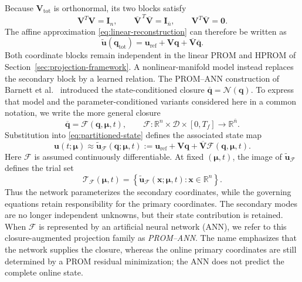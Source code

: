 \documentclass[11pt]{article}
\newcommand{\q}{\mathbf q}
\newcommand{\qbar}{\overline{\mathbf q}}
\newcommand{\qtot}{\mathbf q_{\mathrm{tot}}}
\newcommand{\uvec}{\mathbf u}
\newcommand{\utilde}{\widetilde{\mathbf u}}
\newcommand{\mub}{\bm\mu}
\begin{document}
Because $\mathbf V_{\mathrm{tot}}$ is orthonormal, its two blocks satisfy
\begin{equation}
\mathbf V^T\mathbf V=\mathbf I_n,\qquad
\overline{\mathbf V}^{\,T}\overline{\mathbf V}=\mathbf I_{\bar n},\qquad
\mathbf V^T\overline{\mathbf V}=\mathbf0.
\label{eq:partition-orthogonality}
\end{equation}
The affine approximation \eqref{eq:linear-reconstruction} can therefore be
written as
\begin{equation}
\utilde(\qtot)=\uvec_{\mathrm{ref}}+\mathbf V\q+
\overline{\mathbf V}\qbar.
\label{eq:partitioned-state}
\end{equation}
Both coordinate blocks remain independent in the linear PROM and HPROM of
Section~\ref{sec:projection-framework}.  A nonlinear-manifold model instead
replaces the secondary block by a learned relation.  The PROM--ANN
construction of Barnett et al.~\cite{barnett2023neural} introduced the
state-conditioned closure $\qbar=\mathcal N(\q)$.  To express that model and
the parameter-conditioned variants considered here in a common notation, we
write the more general closure
\begin{equation}
\qbar=\mathcal F(\q,\mub,t),
\qquad
\mathcal F:\mathbb R^n\times\mathcal D\times[0,T_f]
\longrightarrow\mathbb R^{\bar n}.
\label{eq:closure-map}
\end{equation}
Substitution into \eqref{eq:partitioned-state} defines the associated state
map
\begin{equation}
\uvec(t;\mub)\approx
\utilde_{\mathcal F}(\q;\mub,t)
:=\uvec_{\mathrm{ref}}+\mathbf V\q+
\overline{\mathbf V}\mathcal F(\q,\mub,t).
\label{eq:closure-manifold}
\end{equation}
Here $\mathcal F$ is assumed continuously differentiable.  At fixed
$(\mub,t)$, the image of $\utilde_{\mathcal F}$ defines the trial set
\begin{equation}
\mathcal T_{\mathcal F}(\mub,t)=
\left\{\utilde_{\mathcal F}(\mathbf x;\mub,t):
\mathbf x\in\mathbb R^n\right\}.
\label{eq:closure-trial-set}
\end{equation}
Thus the network parameterizes the secondary coordinates, while the
governing equations retain responsibility for the primary coordinates.
The secondary modes are no longer independent unknowns, but their state
contribution is retained.
When $\mathcal F$ is represented by an artificial neural network (ANN), we
refer to this closure-augmented projection family as \emph{PROM--ANN}.  The
name emphasizes that the network supplies the closure, whereas the online
primary coordinates are still determined by a PROM residual minimization;
the ANN does not predict the complete online state.
\end{document}
